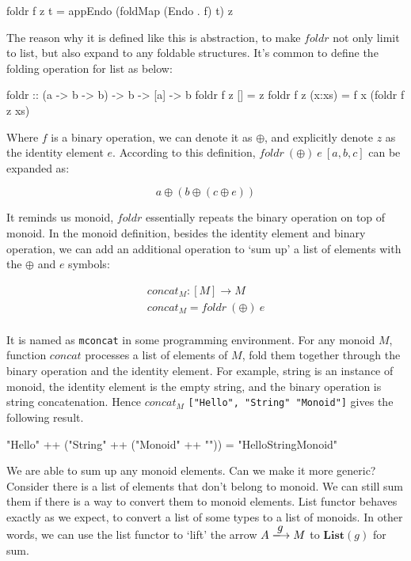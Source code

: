 \documentclass[b5paper]{article}
\begin{document}
\begin{Haskell}
foldr f z t = appEndo (foldMap (Endo . f) t) z
\end{Haskell}

The reason why it is defined like this is abstraction, to make $foldr$ not only limit to list, but also expand to any foldable structures. It's common to define the folding operation for list as below:

\begin{Haskell}
foldr :: (a -> b -> b) -> b -> [a] -> b
foldr f z [] = z
foldr f z (x:xs) = f x (foldr f z xs)
\end{Haskell}

Where $f$ is a binary operation, we can denote it as $\oplus$, and explicitly denote $z$ as the identity element $e$. According to this definition, $foldr\ (\oplus)\ e\ [a, b, c]$ can be expanded as:

\[
a \oplus (b \oplus (c \oplus e))
\]

It reminds us monoid, $foldr$ essentially repeats the binary operation on top of monoid. In the monoid definition, besides the identity element and binary operation, we can add an additional operation to `sum up' a list of elements with the $\oplus$ and $e$ symbols:

\[
\begin{array}{l}
concat_M : [M] \to M \\
concat_M = foldr\ (\oplus)\ e \\
\end{array}
\]

It is named as \texttt{mconcat} in some programming environment. For any monoid $M$, function $concat$ processes a list of elements of $M$, fold them together through the binary operation and the identity element. For example, string is an instance of monoid, the identity element is the empty string, and the binary operation is string concatenation. Hence $concat_M$ \texttt{["Hello", "String" "Monoid"]} gives the following result.

\begin{Haskell}[frame = none]
"Hello" ++ ("String" ++ ("Monoid" ++ "")) = "HelloStringMonoid"
\end{Haskell}

We are able to sum up any monoid elements. Can we make it more generic? Consider there is a list of elements that don't belong to monoid. We can still sum them if there is a way to convert them to monoid elements. List functor behaves exactly as we expect, to convert a list of some types to a list of monoids. In other words, we can use the list functor to `lift' the arrow $A \arrowto{g} M$ to $\mathbf{List}(g)$ for sum.
\end{document}
